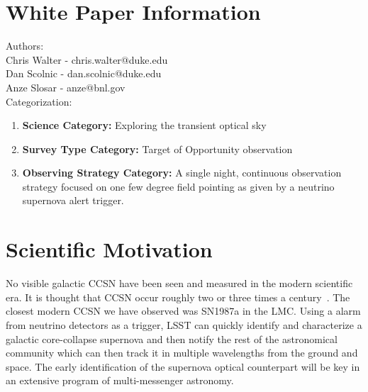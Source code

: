 \documentclass[12pt, letterpaper]{article}
\begin{document}
\section{White Paper Information}

\noindent
Authors: \\

\noindent
Chris Walter - chris.walter@duke.edu \\
Dan Scolnic - dan.scolnic@duke.edu \\
Anze Slosar - anze@bnl.gov \\

\noindent
Categorization: 
\begin{enumerate} 
\item {\bf Science Category:}  Exploring the transient optical sky
\item {\bf Survey Type Category:}  Target of Opportunity observation
\item {\bf Observing Strategy Category:}  A single night, continuous
  observation strategy focused on one few degree field pointing as given by
  a neutrino supernova alert trigger.
\end{enumerate}  

\clearpage

\section{Scientific Motivation}
\label{sec:motivation}

No visible galactic CCSN have been seen and measured in the modern
scientific era. It is thought that CCSN occur roughly two or three
times a century~\cite{CCSN-RATE}.  The closest modern CCSN we have
observed was SN1987a in the LMC.  Using a alarm from neutrino
detectors as a trigger, LSST can quickly identify and characterize a
galactic core-collapse supernova and then notify the rest of the
astronomical community which can then track it in multiple wavelengths
from the ground and space.  The early identification of the supernova
optical counterpart will be key in an extensive program of
multi-messenger astronomy.
\end{document}
